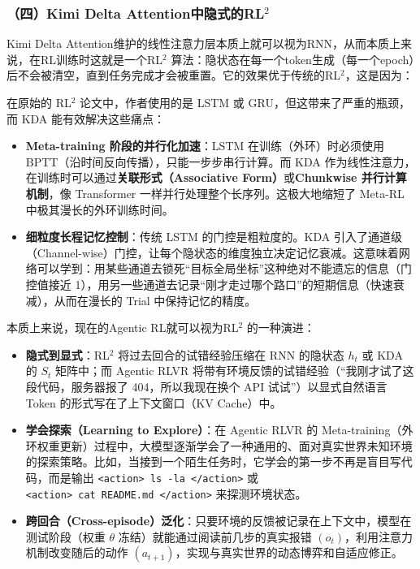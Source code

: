 \hypertarget{ux56dbkimi-delta-attentionux4e2dux9690ux5f0fux7684rl2}{%
\subsubsection{\texorpdfstring{（四）Kimi Delta Attention中隐式的RL\(^2\)}{（四）Kimi Delta Attention中隐式的RL\^{}2}}\label{ux56dbkimi-delta-attentionux4e2dux9690ux5f0fux7684rl2}}

Kimi Delta Attention维护的线性注意力层本质上就可以视为RNN，从而本质上来说，在RL训练时这就是一个RL\(^2\) 算法：隐状态在每一个token生成（每一个epoch）后不会被清空，直到任务完成才会被重置。它的效果优于传统的RL\(^2\)，这是因为：

在原始的 RL\(^2\) 论文中，作者使用的是 LSTM 或 GRU，但这带来了严重的瓶颈，而 KDA 能有效解决这些痛点：

\begin{itemize}
\tightlist
\item
  \textbf{Meta-training 阶段的并行化加速}：LSTM 在训练（外环）时必须使用 BPTT（沿时间反向传播），只能一步步串行计算。而 KDA 作为线性注意力，在训练时可以通过\textbf{关联形式（Associative Form）}或\textbf{Chunkwise 并行计算机制}，像 Transformer 一样并行处理整个长序列。这极大地缩短了 Meta-RL 中极其漫长的外环训练时间。
\item
  \textbf{细粒度长程记忆控制}：传统 LSTM 的门控是粗粒度的。KDA 引入了通道级（Channel-wise）门控，让每个隐状态的维度独立决定记忆衰减。这意味着网络可以学到：用某些通道去锁死``目标全局坐标''这种绝对不能遗忘的信息（门控值接近 1），用另一些通道去记录``刚才走过哪个路口''的短期信息（快速衰减），从而在漫长的 Trial 中保持记忆的精度。
\end{itemize}

本质上来说，现在的Agentic RL就可以视为RL\(^2\) 的一种演进：

\begin{itemize}
\tightlist
\item
  \textbf{隐式到显式}：RL\(^2\) 将过去回合的试错经验压缩在 RNN 的隐状态 \(h_t\) 或 KDA 的 \(S_t\) 矩阵中；而 Agentic RLVR 将带有环境反馈的试错经验（``我刚才试了这段代码，服务器报了 404，所以我现在换个 API 试试''）以显式自然语言 Token 的形式写在了上下文窗口（KV Cache）中。
\item
  \textbf{学会探索（Learning to Explore）}：在 Agentic RLVR 的 Meta-training（外环权重更新）过程中，大模型逐渐学会了一种通用的、面对真实世界未知环境的探索策略。比如，当接到一个陌生任务时，它学会的第一步不再是盲目写代码，而是输出 \texttt{\textless{}action\textgreater{}\ ls\ -la\ \textless{}/action\textgreater{}} 或 \texttt{\textless{}action\textgreater{}\ cat\ README.md\ \textless{}/action\textgreater{}} 来探测环境状态。
\item
  \textbf{跨回合（Cross-episode）泛化}：只要环境的反馈被记录在上下文中，模型在测试阶段（权重 \(\theta\) 冻结）就能通过阅读前几步的真实报错 \((o_t)\)，利用注意力机制改变随后的动作 \((a_{t+1})\)，实现与真实世界的动态博弈和自适应修正。
\end{itemize}

